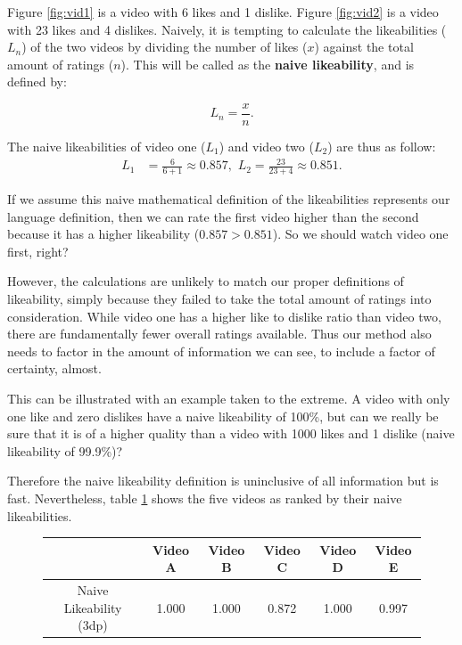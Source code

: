 \documentclass[a4paper,11pt]{article}
\begin{document}
Figure \ref{fig:vid1} is a video with 6 likes and 1 dislike. Figure \ref{fig:vid2} is a video with 23 likes and 4 dislikes. Naively, it is tempting to calculate the likeabilities ($L_n$) of the two videos by dividing the number of likes ($x$) against the total amount of ratings ($n$). This will be called as the \textbf{naive likeability}, and is defined by:

\[
L_n = \frac{x}{n}.
\]

The naive likeabilities of video one ($L_1$) and video two ($L_2$) are thus as follow:
\begin{align*}
    L_{1} &= \frac{6}{6+1} \approx 0.857, \,\, L_{2} = \frac{23}{23 + 4} \approx 0.851.
\end{align*}

If we assume this naive mathematical definition of the likeabilities represents our language definition, then we can rate the first video higher than the second because it has a higher likeability ($0.857 > 0.851$). So we should watch video one first, right?

However, the calculations are unlikely to match our proper definitions of likeability, simply because they failed to take the total amount of ratings into consideration. While video one has a higher like to dislike ratio than video two, there are fundamentally fewer overall ratings available. Thus our method also needs to factor in the amount of information we can see, to include a factor of certainty, almost.

This can be illustrated with an example taken to the extreme. A video with only one like and zero dislikes have a naive likeability of 100\%, but can we really be sure that it is of a higher quality than a video with 1000 likes and 1 dislike (naive likeability of 99.9\%)?

Therefore the naive likeability definition is uninclusive of all information but is fast. Nevertheless, table \ref{tbl:naive} shows the five videos as ranked by their naive likeabilities.

\begin{figure}[H]
    \centering
    \begin{tabular}{c|c|c|c|c|c}
        & Video A & Video B & Video C & Video D & Video E \\
        \hline
        \hline
        Naive Likeability (3dp) & 1.000 & 1.000 & 0.872 & 1.000 & 0.997
    \end{tabular}
    \label{tbl:naive}
\end{figure}
\end{document}
